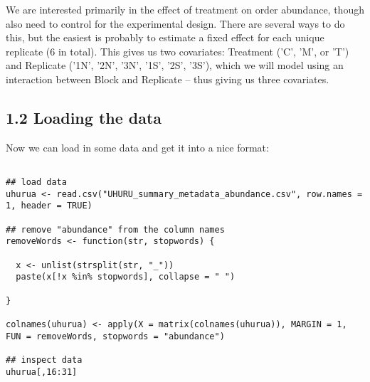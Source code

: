 \documentclass[11pt]{article}
\begin{document}
We are interested primarily in the effect of treatment on order abundance, though also need to control for the experimental design. There are several ways to do this, but the easiest is probably to estimate a fixed effect for each unique replicate (6 in total). This gives us two covariates: Treatment ('C', 'M', or 'T') and Replicate ('1N', '2N', '3N', '1S', '2S', '3S'), which we will model using an interaction between Block and Replicate -- thus giving us three covariates.

\subsection*{1.2 Loading the data}
\label{sec:orgbdec0cb}

Now we can load in some data and get it into a nice format:

\begin{verbatim}

## load data
uhurua <- read.csv("UHURU_summary_metadata_abundance.csv", row.names = 1, header = TRUE)

## remove "abundance" from the column names
removeWords <- function(str, stopwords) {

  x <- unlist(strsplit(str, "_"))
  paste(x[!x %in% stopwords], collapse = " ")

}

colnames(uhurua) <- apply(X = matrix(colnames(uhurua)), MARGIN = 1, FUN = removeWords, stopwords = "abundance")

## inspect data
uhurua[,16:31]

\end{verbatim}
\end{document}
